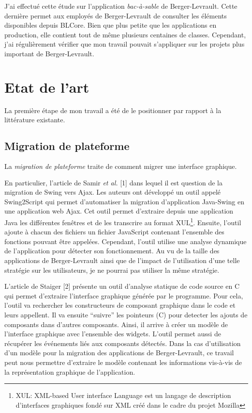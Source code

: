 \documentclass[11pt,]{article}
\begin{document}
J'ai effectué cette étude sur l'application \emph{bac-à-sable} de
Berger-Levrault. Cette dernière permet aux employés de Berger-Levrault
de consulter les éléments disponibles depuis BLCore. Bien que plus
petite que les applications en production, elle contient tout de même
plusieurs centaines de classes. Cependant, j'ai régulièrement vérifier
que mon travail pouvait s'appliquer sur les projets plus important de
Berger-Levrault.

\newpage

\hypertarget{etat-de-lart}{%
\section{Etat de l'art}\label{etat-de-lart}}

La première étape de mon travail a été de le positionner par rapport à
la littérature existante.

\hypertarget{migration-de-plateforme}{%
\subsection{Migration de plateforme}\label{migration-de-plateforme}}

La \emph{migration de plateforme} traite de comment migrer une interface
graphique.

En particulier, l'article de Samir \emph{et al.} {[}1{]} dans lequel il
est question de la migration de Swing vers Ajax. Les auteurs ont
développé un outil appelé Swing2Script qui permet d'automatiser la
migration d'application Java-Swing en une application web Ajax. Cet
outil permet d'extraire depuis une application Java les différentes
fenêtres et de les transcrire au format XUL\footnote{XUL: XML-based User
  interface Language est un langage de description d'interfaces
  graphiques fondé sur XML créé dans le cadre du projet Mozilla}.
Ensuite, l'outil ajoute à chacun des fichiers un fichier JavaScript
contenant l'ensemble des fonctions pouvant être appelées. Cependant,
l'outil utilise une analyse dynamique de l'application pour détecter son
fonctionnement. Au vu de la taille des applications de Berger-Levrault
ainsi que de l'impact de l'utilisation d'une telle stratégie sur les
utilisateurs, je ne pourrai pas utiliser la même stratégie.

L'article de Staiger {[}2{]} présente un outil d'analyse statique de
code source en C qui permet d'extraire l'interface graphique générée par
le programme. Pour cela, l'outil va rechercher les constructeurs de
composant graphique dans le code et leurs appellent. Il va ensuite
``suivre'' les pointeurs (C) pour detecter les ajouts de composants dans
d'autres composants. Ainsi, il arrive à créer un modèle de l'interface
graphique avec l'ensemble des widgets. L'outil permet aussi de récupérer
les événements liés aux composants détectés. Dans la cas d'utilisation
d'un modèle pour la migration des applications de Berger-Levrault, ce
travail peut nous permettre d'extraire le modèle contenant les
informations vis-à-vis de la représentation graphique de l'application.
\end{document}
